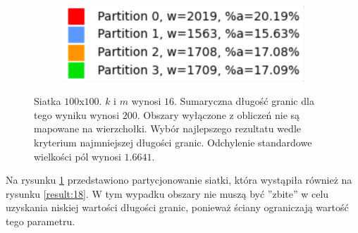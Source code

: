 \begin{figure}[h]
\begin{subfigure}{.33\textwidth}
    \caption[short]{}
\end{subfigure}
\begin{subfigure}{.33\textwidth}
    \centering
    \includegraphics[width=0.9\linewidth]{images/results/m/5/results}
    \caption[short]{}
\end{subfigure}
\caption{Siatka $100$x$100$. $k$ i $m$ wynosi $16$.
Sumaryczna długość granic dla tego wyniku wynosi $200$.
Obszary wyłączone z obliczeń nie są mapowane na wierzchołki.
Wybór najlepszego rezultatu wedle kryterium najmniejszej długości granic.
Odchylenie standardowe wielkości pól wynosi $1.6641$.}
\label{result:m:5}
\end{figure}

Na rysunku \ref{result:m:5} przedstawiono partycjonowanie siatki, która wystąpiła również na rysunku \ref{result:18}.
W tym wypadku obszary nie muszą być ''zbite'' w celu uzyskania niskiej wartości długości granic, ponieważ
ściany ograniczają wartość tego parametru.
